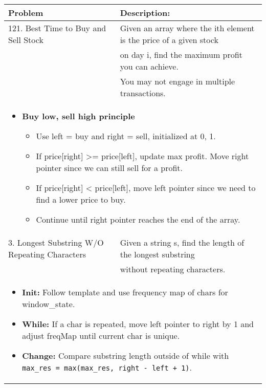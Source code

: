 \begin{summary}
    \begin{center}
        \begin{tabular}{ll}
            \toprule
            \textbf{Problem} & \textbf{Description:} \\
            \midrule
            121. Best Time to Buy and Sell Stock & Given an array where the ith element is the price of a given stock \\ 
            & on day i, find the maximum profit you can achieve. \\ 
            & You may not engage in multiple transactions. \\
            \multicolumn{2}{p{\linewidth}}{
                \begin{itemize}
                    \item \textbf{Buy low, sell high principle}
                    \begin{itemize}
                        \item Use left = buy and right = sell, initialized at 0, 1. 
                        \item If price[right] >= price[left], update max profit. Move right pointer since we can still sell for a profit.
                        \item If price[right] < price[left], move left pointer since we need to find a lower price to buy.
                        \item Continue until right pointer reaches the end of the array.
                    \end{itemize}
                \end{itemize}
            } \\
            \midrule
            3. Longest Substring W/O Repeating Characters & Given a string s, find the length of the longest substring \\
            & without repeating characters. \\
            \multicolumn{2}{p{\linewidth}}{
                \begin{itemize}
                    \item \textbf{Init:} Follow template and use frequency map of chars for window\_state.
                    \item \textbf{While:} If a char is repeated, move left pointer to right by 1 and adjust freqMap until current char is unique. 
                    \item \textbf{Change:} Compare substring length outside of while with \texttt{max\_res = max(max\_res, right - left + 1)}.

\end{itemize}}
\end{tabular}
\end{center}
\end{summary}
